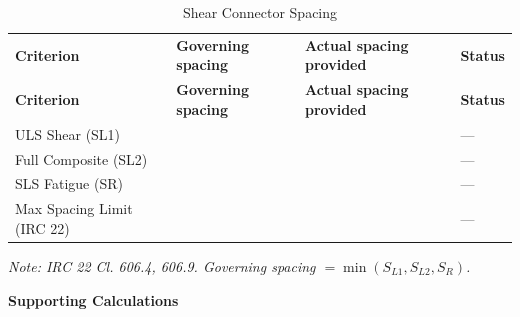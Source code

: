 \documentclass[12pt,a4paper]{report}
\numberwithin{figure}{chapter}
\begin{document}
\vspace{1em}

\begin{longtable}{|L{3.63cm}|C{3.56cm}|C{3.57cm}|C{2.91cm}|}
\caption{Shear Connector Spacing}\\
\hline
\textbf{Criterion} & \textbf{Governing spacing} & \textbf{Actual spacing provided} & \textbf{Status} \\
\hline
\endfirsthead
\hline
\textbf{Criterion} & \textbf{Governing spacing} & \textbf{Actual spacing provided} & \textbf{Status} \\
\hline
\endhead
ULS Shear (SL1) &  &  & --- \\
\hline
Full Composite (SL2) &  &  & --- \\
\hline
SLS Fatigue (SR) &  &  & --- \\
\hline
Max Spacing Limit (IRC 22) &  &  & --- \\
\hline
\end{longtable}
\noindent\textit{Note: IRC 22 Cl. 606.4, 606.9.
Governing spacing $= \min(S_{L1}, S_{L2}, S_R)$.}

    \vspace{0.4em}

    \noindent
    \textbf{Supporting Calculations}
\end{document}
